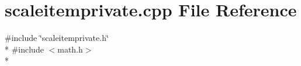 \section{scaleitemprivate.\+cpp File Reference}
\label{bk3_2axes_2scaleitemprivate_8cpp}
{\ttfamily \#include \char`\"{}scaleitemprivate.\+h\char`\"{}}\\*
{\ttfamily \#include $<$math.\+h$>$}\\*
